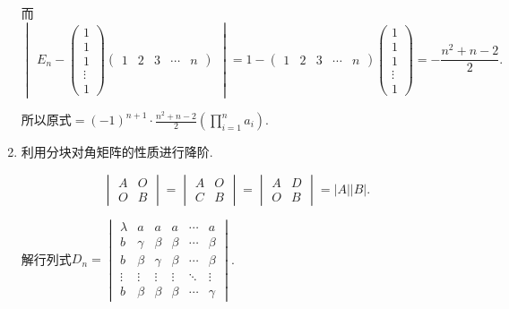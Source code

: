 \begin{enumerate}
\begin{solution}
            而 \[ \begin{vmatrix}E_n-\begin{pmatrix}
                        1 \\1\\1\\\vdots\\1
                    \end{pmatrix}\begin{pmatrix}1 & 2 & 3 & \cdots & n\end{pmatrix}\end{vmatrix}
                =1-\begin{pmatrix}1 & 2 & 3 & \cdots & n\end{pmatrix}
                \begin{pmatrix}1 \\ 1 \\ 1 \\ \vdots \\ 1\end{pmatrix}
                =-\frac{n^2+n-2}{2}. \]

            所以原式$\displaystyle =(-1)^{n+1} \cdot \frac{n^2+n-2}{2} \left(\prod_{i=1}^na_i \right)$.
        \end{solution}

    \item 利用分块对角矩阵的性质进行降阶.

        \[
            \begin{vmatrix}
                A & O \\ O & B
            \end{vmatrix} = \begin{vmatrix}
                A & O \\ C & B
            \end{vmatrix} = \begin{vmatrix}
                A & D \\ O & B
            \end{vmatrix} = |A||B|.
        \]

        \begin{example}{}{}
            解行列式$D_n=\begin{vmatrix}
                    \lambda & a      & a      & a      & \cdots & a      \\
                    b       & \gamma & \beta  & \beta  & \cdots & \beta  \\
                    b       & \beta  & \gamma & \beta  & \cdots & \beta  \\
                    \vdots  & \vdots & \vdots & \vdots & \ddots & \vdots \\
                    b       & \beta  & \beta  & \beta  & \cdots & \gamma
                \end{vmatrix}$.
        \end{example}


\end{enumerate}
